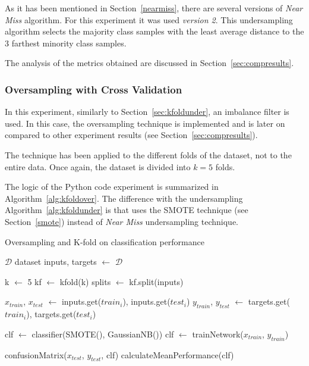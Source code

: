 As it has been mentioned in Section~\ref{nearmiss}, there are several versions 
of \textit{Near Miss} algorithm. For this experiment it was used \textit{version 
2}. This undersampling algorithm selects the majority class samples with the 
least average distance to the 3 farthest minority class samples.

The analysis of the metrics obtained are discussed in 
Section~\ref{sec:compresults}.

\subsubsection{Oversampling with Cross Validation}

In this experiment, similarly to Section~\ref{sec:kfoldunder}, an imbalance 
filter is used. In this case, the oversampling technique is implemented and is 
later on compared to other experiment results (see 
Section~\ref{sec:compresults}).

The technique has been applied to the different folds of the dataset, not to the
entire data. Once again, the dataset is divided into $k=5$ folds. 

The logic of the Python code experiment is summarized in 
Algorithm~\ref{alg:kfoldover}. The difference with the undersampling 
Algorithm~\ref{alg:kfoldunder} is that uses the SMOTE technique (see 
Section~\ref{smote}) instead of \textit{Near Miss} undersampling technique.

\begin{breakablealgorithm}
    \caption{Oversampling and K-fold on classification performance}
    \footnotesize
    \label{alg:kfoldover}
    \begin{algorithmic}[1]
        \Require $\mathcal{D}$ dataset
        \State inputs, targets $\leftarrow$ $\mathcal{D}$
    
        \State k $\leftarrow$ 5
        \State kf $\leftarrow$ kfold(k)
        \State splits $\leftarrow$ kf.split(inputs)
        
        	\State $x_{train}$, $x_{test}$ $\leftarrow$ inputs.get($train_{i}$), inputs.get($test_{i}$)
        	\State $y_{train}$, $y_{test}$ $\leftarrow$ targets.get($train_{i}$), targets.get($test_{i}$)
        	
        	\State clf $\leftarrow$ classifier(SMOTE(), GaussianNB())
        	\State clf $\leftarrow$ trainNetwork($x_{train}$, $y_{train}$)
        	
        	\State confusionMatrix($x_{test}$, $y_{test}$, clf)
        \EndFor
        \State calculateMeanPerformance(clf)
    \end{algorithmic}
\end{breakablealgorithm}

